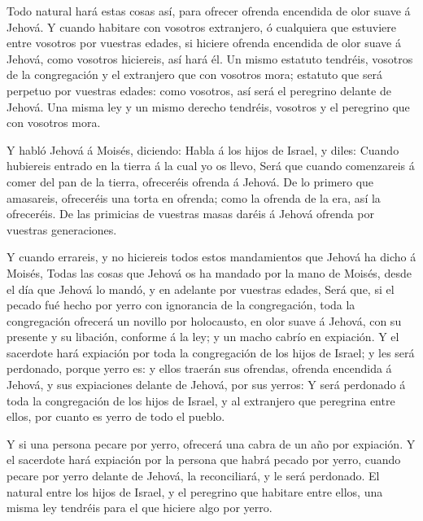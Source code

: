 Todo natural hará estas cosas así, para ofrecer ofrenda
encendida de olor suave á Jehová.  Y cuando habitare con
vosotros extranjero, ó cualquiera que estuviere entre vosotros por
vuestras edades, si hiciere ofrenda encendida de olor suave á Jehová,
como vosotros hiciereis, así hará él.  Un mismo estatuto
tendréis, vosotros de la congregación y el extranjero que con vosotros
mora; estatuto que será perpetuo por vuestras edades: como vosotros, así
será el peregrino delante de Jehová.  Una misma ley y un
mismo derecho tendréis, vosotros y el peregrino que con vosotros mora.

 Y habló Jehová á Moisés, diciendo:  Habla á
los hijos de Israel, y diles: Cuando hubiereis entrado en la tierra á la
cual yo os llevo,  Será que cuando comenzareis á comer del
pan de la tierra, ofreceréis ofrenda á Jehová.  De lo
primero que amasareis, ofreceréis una torta en ofrenda; como la ofrenda
de la era, así la ofreceréis.  De las primicias de vuestras
masas daréis á Jehová ofrenda por vuestras generaciones.

 Y cuando errareis, y no hiciereis todos estos mandamientos
que Jehová ha dicho á Moisés,  Todas las cosas que Jehová
os ha mandado por la mano de Moisés, desde el día que Jehová lo mandó, y
en adelante por vuestras edades,  Será que, si el pecado
fué hecho por yerro con ignorancia de la congregación, toda la
congregación ofrecerá un novillo por holocausto, en olor suave á Jehová,
con su presente y su libación, conforme á la ley; y un macho cabrío en
expiación.  Y el sacerdote hará expiación por toda la
congregación de los hijos de Israel; y les será perdonado, porque yerro
es: y ellos traerán sus ofrendas, ofrenda encendida á Jehová, y sus
expiaciones delante de Jehová, por sus yerros:  Y será
perdonado á toda la congregación de los hijos de Israel, y al extranjero
que peregrina entre ellos, por cuanto es yerro de todo el pueblo.

 Y si una persona pecare por yerro, ofrecerá una cabra de
un año por expiación.  Y el sacerdote hará expiación por la
persona que habrá pecado por yerro, cuando pecare por yerro delante de
Jehová, la reconciliará, y le será perdonado.  El natural
entre los hijos de Israel, y el peregrino que habitare entre ellos, una
misma ley tendréis para el que hiciere algo por yerro.

